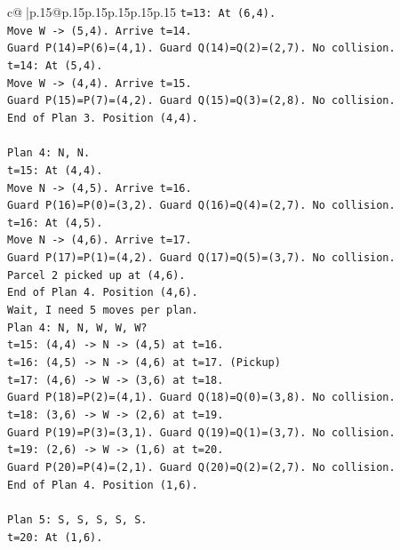\documentclass{article}
\begin{document}
{\begin{supertabular}{c@{$\;$}|p{.15\linewidth}@{}p{.15\linewidth}p{.15\linewidth}p{.15\linewidth}p{.15\linewidth}p{.15\linewidth}}
{{{\texttt{t=13: At (6,4).} \\
\texttt{Move W {-}> (5,4). Arrive t=14.} \\
\texttt{Guard P(14)=P(6)=(4,1). Guard Q(14)=Q(2)=(2,7). No collision.} \\
\texttt{t=14: At (5,4).} \\
\texttt{Move W {-}> (4,4). Arrive t=15.} \\
\texttt{Guard P(15)=P(7)=(4,2). Guard Q(15)=Q(3)=(2,8). No collision.} \\
\texttt{End of Plan 3. Position (4,4).} \\
\\ 
\texttt{Plan 4: N, N.} \\
\texttt{t=15: At (4,4).} \\
\texttt{Move N {-}> (4,5). Arrive t=16.} \\
\texttt{Guard P(16)=P(0)=(3,2). Guard Q(16)=Q(4)=(2,7). No collision.} \\
\texttt{t=16: At (4,5).} \\
\texttt{Move N {-}> (4,6). Arrive t=17.} \\
\texttt{Guard P(17)=P(1)=(4,2). Guard Q(17)=Q(5)=(3,7). No collision.} \\
\texttt{Parcel 2 picked up at (4,6).} \\
\texttt{End of Plan 4. Position (4,6).} \\
\texttt{Wait, I need 5 moves per plan.} \\
\texttt{Plan 4: N, N, W, W, W?} \\
\texttt{t=15: (4,4) {-}> N {-}> (4,5) at t=16.} \\
\texttt{t=16: (4,5) {-}> N {-}> (4,6) at t=17. (Pickup)} \\
\texttt{t=17: (4,6) {-}> W {-}> (3,6) at t=18.} \\
\texttt{Guard P(18)=P(2)=(4,1). Guard Q(18)=Q(0)=(3,8). No collision.} \\
\texttt{t=18: (3,6) {-}> W {-}> (2,6) at t=19.} \\
\texttt{Guard P(19)=P(3)=(3,1). Guard Q(19)=Q(1)=(3,7). No collision.} \\
\texttt{t=19: (2,6) {-}> W {-}> (1,6) at t=20.} \\
\texttt{Guard P(20)=P(4)=(2,1). Guard Q(20)=Q(2)=(2,7). No collision.} \\
\texttt{End of Plan 4. Position (1,6).} \\
\\ 
\texttt{Plan 5: S, S, S, S, S.} \\
\texttt{t=20: At (1,6).} \\
}}}
\end{supertabular}}
\end{document}
